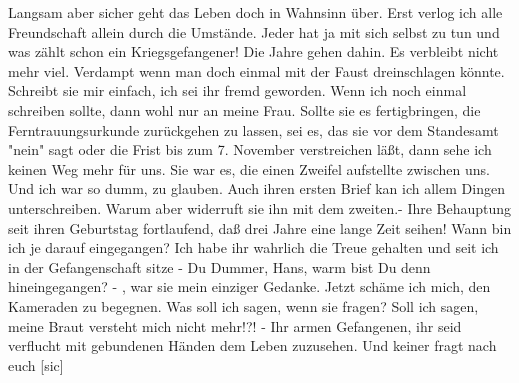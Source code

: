 \def\day{28. Juni 1944}
\mktitle

Langsam aber sicher geht das Leben doch in Wahnsinn \"{u}ber.
Erst verlog ich alle Freundschaft allein durch die Umst\"{a}nde.
Jeder hat ja mit sich selbst zu tun und was z\"{a}hlt schon ein Kriegsgefangener!
Die Jahre gehen dahin.
Es verbleibt nicht mehr viel.
Verdampt wenn man doch einmal mit der Faust dreinschlagen k\"{o}nnte.
Schreibt sie mir einfach, ich sei ihr fremd geworden.
Wenn ich noch einmal schreiben sollte, dann wohl nur an meine Frau.
Sollte sie es fertigbringen, die Ferntrauungsurkunde zur\"{u}ckgehen zu lassen, sei es, das sie vor dem Standesamt "nein" sagt oder die Frist bis zum 7. November verstreichen l\"{a}{\ss}t, dann sehe ich keinen Weg mehr f\"{u}r uns.
Sie war es, die einen Zweifel aufstellte zwischen uns.
Und ich war so dumm, zu glauben.
Auch ihren ersten Brief kan ich allem Dingen unterschreiben.
Warum aber widerruft sie ihn mit dem zweiten.-
Ihre Behauptung seit ihren Geburtstag fortlaufend, da{\ss} drei Jahre eine lange Zeit seihen!
Wann bin ich je darauf eingegangen?
Ich habe ihr wahrlich die Treue gehalten und seit ich in der Gefangenschaft sitze - Du Dummer, Hans, warm bist Du denn hineingegangen? - , war sie mein einziger Gedanke.
Jetzt sch\"{a}me ich mich, den Kameraden zu begegnen.
Was soll ich sagen, wenn sie fragen?
Soll ich sagen, meine Braut versteht mich nicht mehr!?!
- Ihr armen Gefangenen, ihr seid verflucht mit gebundenen H\"{a}nden dem Leben zuzusehen.
Und keiner fragt nach euch{\color{red} [sic] }

\clearpage
